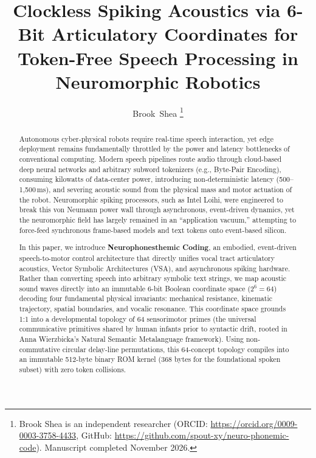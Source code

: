 \documentclass[journal,twocolumn]{IEEEtran}
\begin{document}
\title{Clockless Spiking Acoustics via 6-Bit Articulatory Coordinates for Token-Free Speech Processing in Neuromorphic Robotics}

\author{Brook~Shea%
\thanks{Brook Shea is an independent researcher (ORCID: \url{https://orcid.org/0009-0003-3758-4433}, GitHub: \url{https://github.com/spout-xy/neuro-phonemic-code}). Manuscript completed November 2026.}%
}

\maketitle

\begin{abstract}
Autonomous cyber-physical robots require real-time speech interaction, yet edge deployment remains fundamentally throttled by the power and latency bottlenecks of conventional computing. Modern speech pipelines route audio through cloud-based deep neural networks and arbitrary subword tokenizers (e.g., Byte-Pair Encoding), consuming kilowatts of data-center power, introducing non-deterministic latency (500--1,500\,ms), and severing acoustic sound from the physical mass and motor actuation of the robot. Neuromorphic spiking processors, such as Intel Loihi, were engineered to break this von Neumann power wall through asynchronous, event-driven dynamics, yet the neuromorphic field has largely remained in an ``application vacuum,'' attempting to force-feed synchronous frame-based models and text tokens onto event-based silicon.

In this paper, we introduce \textbf{Neurophonesthemic Coding}, an embodied, event-driven speech-to-motor control architecture that directly unifies vocal tract articulatory acoustics, Vector Symbolic Architectures (VSA), and asynchronous spiking hardware. Rather than converting speech into arbitrary symbolic text strings, we map acoustic sound waves directly into an immutable 6-bit Boolean coordinate space ($2^6 = 64$) decoding four fundamental physical invariants: mechanical resistance, kinematic trajectory, spatial boundaries, and vocalic resonance. This coordinate space grounds 1:1 into a developmental topology of 64 sensorimotor primes (the universal communicative primitives shared by human infants prior to syntactic drift, rooted in Anna Wierzbicka's Natural Semantic Metalanguage framework). Using non-commutative circular delay-line permutations, this 64-concept topology compiles into an immutable 512-byte binary ROM kernel (368 bytes for the foundational spoken subset) with zero token collisions.


\end{abstract}
\end{document}
